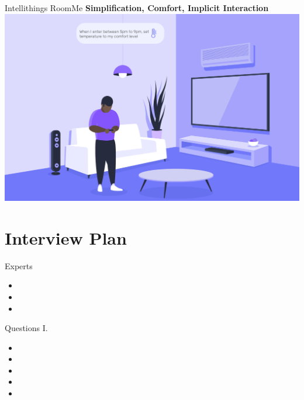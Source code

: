 \documentclass[10pt]{beamer}
\begin{document}
\begin{frame}{Intellithings RoomMe}
	\textbf{Simplification, Comfort, Implicit Interaction}\\
	\vspace{3mm}
	\includegraphics[width=\textwidth]{images/1.png}
\end{frame}


\section{Interview Plan}


\begin{frame}{Experts}
	\begin{itemize}
        \pause{}
		\item
		\pause{}
		\item
		\pause{}
		\item
	\end{itemize}	
\end{frame}


\begin{frame}{Questions I.}
	\begin{itemize}
        \pause{}
		\item
		\pause{}
		\item
		\pause{}
		\item
		\pause{}
		\item
		\pause{}
		\item
	\end{itemize}	
\end{frame}
\end{document}
